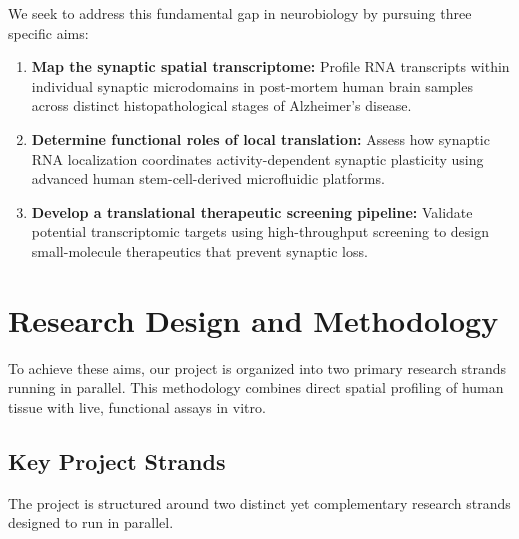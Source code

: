 \documentclass[10pt,a4paper]{article}
\begin{document}
We seek to address this fundamental gap in neurobiology by pursuing three specific aims:
\begin{enumerate}[label=\textbf{\lbrack Aim \arabic*\rbrack}]
    \item \textbf{Map the synaptic spatial transcriptome:} Profile RNA transcripts within individual synaptic microdomains in post-mortem human brain samples across distinct histopathological stages of Alzheimer's disease.
    \item \textbf{Determine functional roles of local translation:} Assess how synaptic RNA localization coordinates activity-dependent synaptic plasticity using advanced human stem-cell-derived microfluidic platforms.
    \item \textbf{Develop a translational therapeutic screening pipeline:} Validate potential transcriptomic targets using high-throughput screening to design small-molecule therapeutics that prevent synaptic loss.
\end{enumerate}

\section{Research Design and Methodology}

To achieve these aims, our project is organized into two primary research strands running in parallel. This methodology combines direct spatial profiling of human tissue with live, functional assays in vitro.

\subsection{Key Project Strands}

The project is structured around two distinct yet complementary research strands designed to run in parallel.
\end{document}
